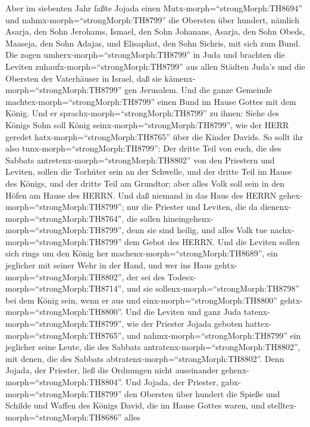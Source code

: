  Aber im siebenten Jahr faßte Jojada einen
Mutx-morph=``strongMorph:TH8694'' und nahmx-morph=``strongMorph:TH8799''
die Obersten über hundert, nämlich Asarja, den Sohn Jerohams, Ismael,
den Sohn Johanans, Asarja, den Sohn Obeds, Maaseja, den Sohn Adajas, und
Elisaphat, den Sohn Sichris, mit sich zum Bund.  Die zogen
umherx-morph=``strongMorph:TH8799'' in Juda und brachten die Leviten
zuhaufx-morph=``strongMorph:TH8799'' aus allen Städten Juda's und die
Obersten der Vaterhäuser in Israel, daß sie
kämenx-morph=``strongMorph:TH8799'' gen Jerusalem.  Und die
ganze Gemeinde machtex-morph=``strongMorph:TH8799'' einen Bund im Hause
Gottes mit dem König. Und er sprachx-morph=``strongMorph:TH8799'' zu
ihnen: Siehe des Königs Sohn soll König
seinx-morph=``strongMorph:TH8799'', wie der HERR geredet
hatx-morph=``strongMorph:TH8765'' über die Kinder Davids. 
So sollt ihr also tunx-morph=``strongMorph:TH8799'': Der dritte Teil von
euch, die des Sabbats antretenx-morph=``strongMorph:TH8802'' von den
Priestern und Leviten, sollen die Torhüter sein an der Schwelle,
 und der dritte Teil im Hause des Königs, und der dritte
Teil am Grundtor; aber alles Volk soll sein in den Höfen am Hause des
HERRN.  Und daß niemand in das Haus des HERRN
gehex-morph=``strongMorph:TH8799''; nur die Priester und Leviten, die da
dienenx-morph=``strongMorph:TH8764'', die sollen
hineingehenx-morph=``strongMorph:TH8799'', denn sie sind heilig, und
alles Volk tue nachx-morph=``strongMorph:TH8799'' dem Gebot des HERRN.
 Und die Leviten sollen sich rings um den König her
machenx-morph=``strongMorph:TH8689'', ein jeglicher mit seiner Wehr in
der Hand, und wer ins Haus gehtx-morph=``strongMorph:TH8802'', der sei
des Todesx-morph=``strongMorph:TH8714'', und sie
sollenx-morph=``strongMorph:TH8798'' bei dem König sein, wenn er aus und
einx-morph=``strongMorph:TH8800'' gehtx-morph=``strongMorph:TH8800''.
 Und die Leviten und ganz Juda
tatenx-morph=``strongMorph:TH8799'', wie der Priester Jojada geboten
hattex-morph=``strongMorph:TH8765'', und
nahmx-morph=``strongMorph:TH8799'' ein jeglicher seine Leute, die des
Sabbats antratenx-morph=``strongMorph:TH8802'', mit denen, die des
Sabbats abtratenx-morph=``strongMorph:TH8802''. Denn Jojada, der
Priester, ließ die Ordnungen nicht auseinander
gehenx-morph=``strongMorph:TH8804''.  Und Jojada, der
Priester, gabx-morph=``strongMorph:TH8799'' den Obersten über hundert
die Spieße und Schilde und Waffen des Königs David, die im Hause Gottes
waren,  und stelltex-morph=``strongMorph:TH8686'' alles
